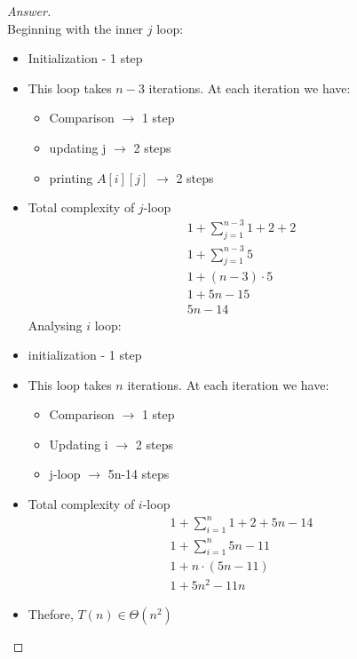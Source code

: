 \documentclass[11pt]{article}
\theoremstyle{definition}
\theoremstyle{definition}
\theoremstyle{definition}
\begin{document}
\begin{proof}[Answer] $ $\\
Beginning with the inner $j$ loop: 
\begin{itemize}
    \item Initialization - 1 step 
    \item This loop takes $n-3$ iterations. At each iteration we have: 
    \begin{itemize}
        \item Comparison $\to$ 1 step 
        \item updating j $\to$ 2 steps 
        \item printing $A[i][j]$ $\to$ 2 steps
    \end{itemize}
    \item Total complexity of $j$-loop
    \begin{align*}
        1 + \sum_{j=1}^{n-3} 1+2+2 \\
        1 + \sum_{j=1}^{n-3} 5 \\
        1 + (n-3)\cdot 5 \\
        1 + 5n - 15 \\
        5n - 14 
    \end{align*}
    Analysing $i$ loop: 
    \item initialization - 1 step
    \item This loop takes $n$ iterations. At each iteration we have: 
    \begin{itemize}
        \item Comparison $\to$ 1 step
        \item Updating i $\to$ 2 steps 
        \item j-loop $\to$ 5n-14 steps
    \end{itemize}
    \item Total complexity of $i$-loop
    \begin{align*}
        1 + \sum_{i=1}^{n} 1 + 2 + 5n - 14 \\
        1 + \sum_{i=1}^{n} 5n - 11 \\
        1 +  n \cdot (5n - 11) \\
        1 + 5n^2 - 11n
    \end{align*}
    \item Thefore, $T(n) \in \Theta(n^2)$
\end{itemize}
\end{proof}



\end{document}
